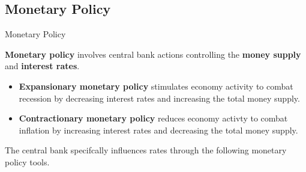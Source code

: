 \documentclass[10pt]{article}
\begin{document}
  \subsection{Monetary Policy}
    \label{core:m_policy}

    \begin{core}[label=core:monetary]{Monetary Policy}

      \textbf{Monetary policy} involves central bank actions controlling the \textbf{money supply} and \textbf{interest rates}.

      \begin{itemize}

        \item \textbf{Expansionary monetary policy} stimulates economy activity to combat recession by decreasing interest rates and increasing the total money supply.

        \item \textbf{Contractionary monetary policy} reduces economy activty to combat inflation by increasing interest rates and decreasing the total money supply.

      \end{itemize}

    \end{core}

    The central bank specifcally influences rates through the following monetary policy tools.
\end{document}

